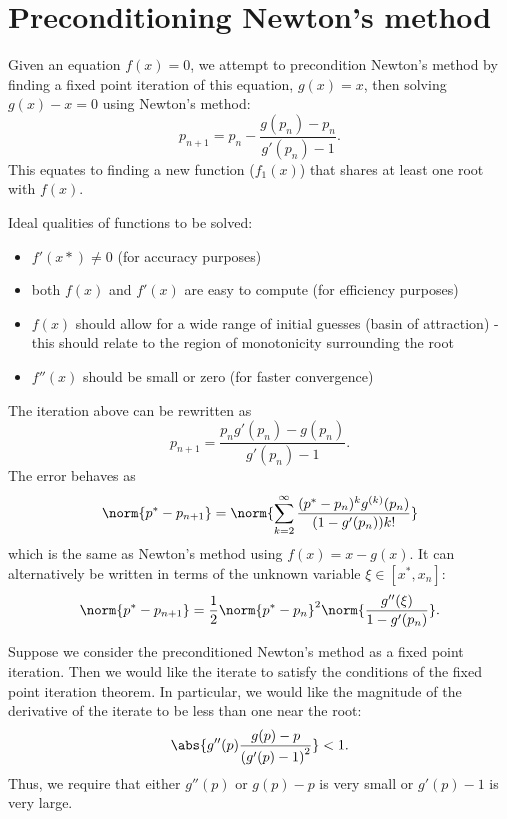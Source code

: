 \documentclass{book}
\begin{document}
\chapter{Preconditioning Newton's method}

Given an equation $f(x) = 0$, we attempt to precondition Newton's method by finding a fixed point iteration of this equation, $g(x) = x$, then solving $g(x) - x = 0$ using Newton's method:
\begin{equation}
p_{n+1} = p_n - \frac{g(p_n) - p_n}{g'(p_n) - 1} .
\end{equation}
This equates to finding a new function ($f_1(x)$) that shares at least one root with $f(x)$.

Ideal qualities of functions to be solved:
\begin{itemize}
\item $f'(x*) \neq 0$ (for accuracy purposes)
\item both $f(x)$ and $f'(x)$ are easy to compute (for efficiency purposes)
\item $f(x)$ should allow for a wide range of initial guesses (basin of attraction) - this should relate to the region of monotonicity surrounding the root
\item $f''(x)$ should be small or zero (for faster convergence)
\end{itemize}

The iteration above can be rewritten as
\begin{equation*}
p_{n+1} = \frac{p_n g'(p_n) - g(p_n)}{g'(p_n) - 1} .
\end{equation*}
The error behaves as
\begin{equation*}
\norm{p^* - p_{n+1}} = \norm{ \sum_{k=2}^\infty \frac{ (p^* - p_n)^k g^{(k)}(p_n) }{(1 - g'(p_n)) k!} }
\end{equation*}
which is the same as Newton's method using $f(x) = x - g(x)$.
It can alternatively be written in terms of the unknown variable $\xi \in [x^*,x_n]$:
\begin{equation*}
\norm{p^* - p_{n+1}} = \frac{1}{2} \norm{p^* - p_n}^2 \norm{ \frac{ g''(\xi) }{1 - g'(p_n)} } .
\end{equation*}

Suppose we consider the preconditioned Newton's method as a fixed point iteration.
Then we would like the iterate to satisfy the conditions of the fixed point iteration theorem.
In particular, we would like the magnitude of the derivative of the iterate to be less than one near the root:
\begin{equation*}
\abs{ g''(p) \frac{g(p) - p}{\left ( g'(p) - 1 \right)^2} } < 1 .
\end{equation*}
Thus, we require that either $g''(p)$ or $g(p) - p$ is very small or $g'(p) - 1$ is very large.
\end{document}
